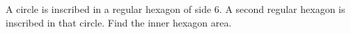 A circle is inscribed in a regular hexagon of side $6$. A second regular hexagon is inscribed in that circle. Find the inner hexagon area.
